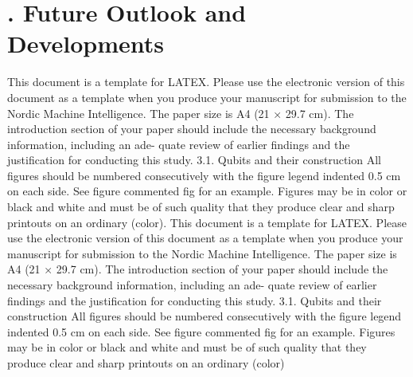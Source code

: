 \documentclass{elbioimp2}
\begin{document}
\section{. Future Outlook and Developments}
This document is a template for LATEX. Please use
the electronic version of this document as a template
when you produce your manuscript for submission to the
Nordic Machine Intelligence. The paper size is A4 (21 ×
29.7 cm).
The introduction section of your paper should include
the necessary background information, including an ade-
quate review of earlier findings and the justification for
conducting this study.
3.1. Qubits and their construction
All figures should be numbered consecutively with the
figure legend indented 0.5 cm on each side. See figure
commented fig for an example. Figures may be in color
or black and white and must be of such quality that they
produce clear and sharp printouts on an ordinary (color).
This document is a template for LATEX. Please use
the electronic version of this document as a template
when you produce your manuscript for submission to the
Nordic Machine Intelligence. The paper size is A4 (21 ×
29.7 cm).
The introduction section of your paper should include
the necessary background information, including an ade-
quate review of earlier findings and the justification for
conducting this study.
3.1. Qubits and their construction
All figures should be numbered consecutively with the
figure legend indented 0.5 cm on each side. See figure
commented fig for an example. Figures may be in color
or black and white and must be of such quality that they
produce clear and sharp printouts on an ordinary (color)

\newpage
\nocite{*}
\printbibliography
\end{document}
